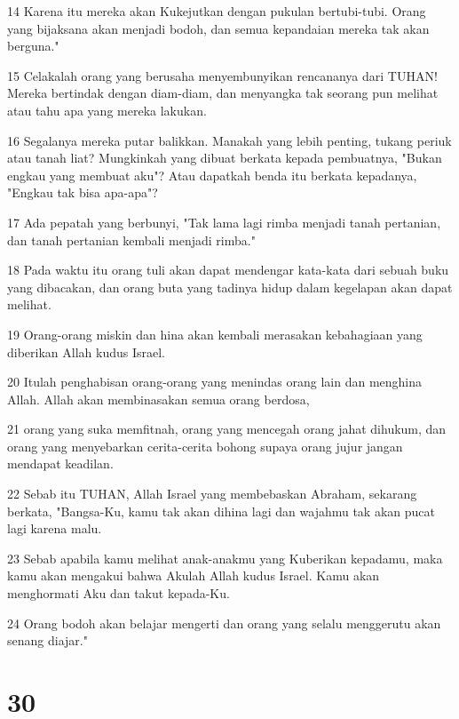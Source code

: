 \par 14 Karena itu mereka akan Kukejutkan dengan pukulan bertubi-tubi. Orang yang bijaksana akan menjadi bodoh, dan semua kepandaian mereka tak akan berguna."
\par 15 Celakalah orang yang berusaha menyembunyikan rencananya dari TUHAN! Mereka bertindak dengan diam-diam, dan menyangka tak seorang pun melihat atau tahu apa yang mereka lakukan.
\par 16 Segalanya mereka putar balikkan. Manakah yang lebih penting, tukang periuk atau tanah liat? Mungkinkah yang dibuat berkata kepada pembuatnya, "Bukan engkau yang membuat aku"? Atau dapatkah benda itu berkata kepadanya, "Engkau tak bisa apa-apa"?
\par 17 Ada pepatah yang berbunyi, "Tak lama lagi rimba menjadi tanah pertanian, dan tanah pertanian kembali menjadi rimba."
\par 18 Pada waktu itu orang tuli akan dapat mendengar kata-kata dari sebuah buku yang dibacakan, dan orang buta yang tadinya hidup dalam kegelapan akan dapat melihat.
\par 19 Orang-orang miskin dan hina akan kembali merasakan kebahagiaan yang diberikan Allah kudus Israel.
\par 20 Itulah penghabisan orang-orang yang menindas orang lain dan menghina Allah. Allah akan membinasakan semua orang berdosa,
\par 21 orang yang suka memfitnah, orang yang mencegah orang jahat dihukum, dan orang yang menyebarkan cerita-cerita bohong supaya orang jujur jangan mendapat keadilan.
\par 22 Sebab itu TUHAN, Allah Israel yang membebaskan Abraham, sekarang berkata, "Bangsa-Ku, kamu tak akan dihina lagi dan wajahmu tak akan pucat lagi karena malu.
\par 23 Sebab apabila kamu melihat anak-anakmu yang Kuberikan kepadamu, maka kamu akan mengakui bahwa Akulah Allah kudus Israel. Kamu akan menghormati Aku dan takut kepada-Ku.
\par 24 Orang bodoh akan belajar mengerti dan orang yang selalu menggerutu akan senang diajar."

\chapter{30}

